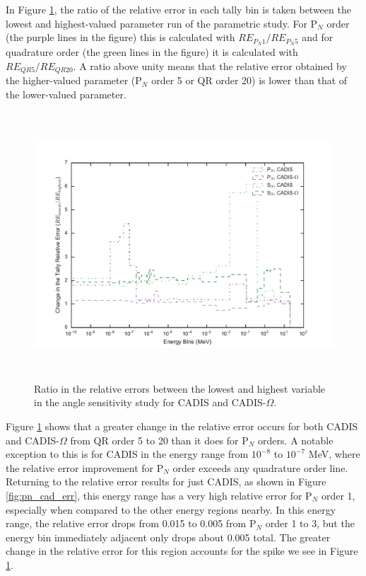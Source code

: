 In Figure
\ref{fig:angle_err_improvements}, the ratio of the relative error in each tally
bin is taken between the lowest and highest-valued parameter run of the
parametric study. For P$_N$ order (the purple lines in the figure)
this is calculated with $RE_{P_N 1}/RE_{P_N 5}$ and for
quadrature order (the green lines in the figure) it is calculated with
$RE_{QR 5}/RE_{QR 20}$.
A ratio above unity means that the relative error obtained by
the higher-valued parameter (P$_N$ order 5 or QR order 20) is lower than that
of the lower-valued parameter.

\begin{figure}[h!]
  \centering
  \includegraphics[height=10cm]{./chapters/characterization_probs/figures/angle/prob_1/improvement_err_allmethds.pdf}
  \caption[Ratio in the relative errors between the lowest and highest variable in the angle
  sensitivity study for CADIS and CADIS-$\Omega$.]{Ratio in the relative errors between
    the lowest and highest variable in the angle sensitivity study for CADIS and CADIS-$\Omega$.}
  \label{fig:angle_err_improvements}
\end{figure}

Figure \ref{fig:angle_err_improvements} shows that a greater change in the
relative error occurs for both CADIS and CADIS-$\Omega$ from QR order 5 to 20
than it does for P$_N$ orders. A notable exception to this is for CADIS in the
energy range from $10^{-8}$ to $10^{-7}$ MeV, where the relative error
improvement for P$_N$ order exceeds any quadrature order line.
Returning to
the relative error results for just CADIS, as shown in Figure
\ref{fig:pn_cad_err}, this energy range has a very high relative error for P$_N$
order 1, especially when compared to the other energy regions nearby. In this
energy range, the relative error drops from 0.015 to 0.005 from P$_N$ order 1 to
3, but the energy bin immediately adjacent
only drops about 0.005 total. The greater change
in the relative error for this region accounts for the spike we see in Figure
\ref{fig:angle_err_improvements}.

